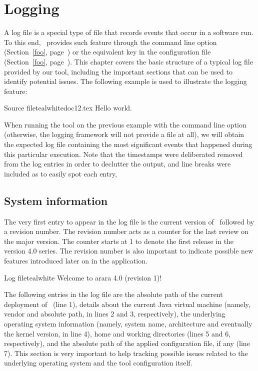 \chapter{Logging}
\label{chap:logging}

A log file is a special type of file that records events that occur in a software run. To this end, \arara\ provides such feature through the  command line option (Section~\ref{foo}, page~\pageref{foo}) or the equivalent key in the configuration file (Section~\ref{foo}, page~\pageref{foo}). This chapter covers the basic structure of a typical log file provided by our tool, including the important sections that can be used to identify potential issues. The following example is used to illustrate the logging feature:

\begin{ncodebox}{Source file}{teal}{\icnote}{white}{doc12.tex}
Hello world.
\bye
\end{ncodebox}

When running the tool on the previous example with the  command line option (otherwise, the logging framework will not provide a file at all), we will obtain the expected  log file containing the most significant events that happened during this particular execution. Note that the timestamps were deliberated removed from the log entries in order to declutter the output, and line breaks were included as to easily spot each entry,

\section{System information}
\label{sec:systeminformation}

The very first entry to appear in the log file is the current version of \arara\ followed by a revision number. The revision number acts as a counter for the last review on the major version. The counter starts at 1 to denote the first release in the version 4.0 series. The revision number is also important to indicate possible new features introduced later on in the application.

\begin{codebox}{Log file}{teal}{\icnote}{white}
Welcome to arara 4.0 (revision 1)!
\end{codebox}

The following entries in the log file are the absolute path of the current deployment of \arara\ (line 1), details about the current Java virtual machine (namely, vendor and absolute path, in lines 2 and 3, respectively), the underlying operating system information (namely, system name, architecture and eventually the kernel version, in line 4), home and working directories (lines 5 and 6, respectively), and the absolute path of the applied configuration file, if any (line 7). This section is very important to help tracking possible issues related to the underlying operating system and the tool configuration itself.

